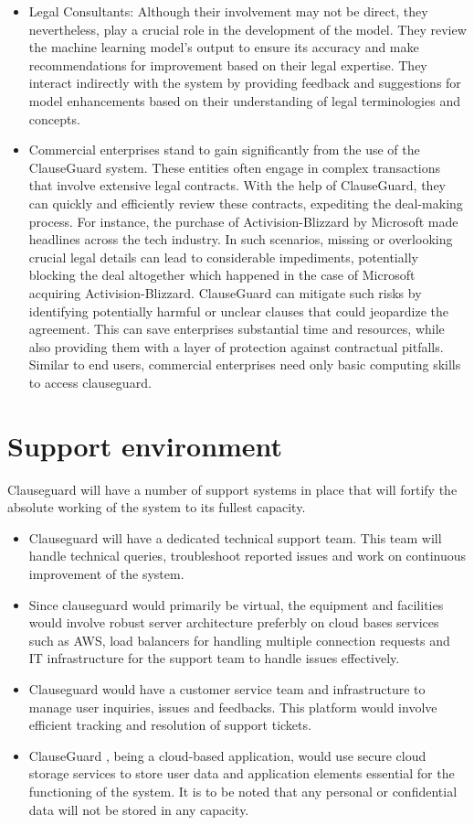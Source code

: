 \begin{itemize}
    \item Legal Consultants: Although their involvement may not be direct, they nevertheless, play a crucial role in the development of the model. They review the machine learning model's output to ensure its accuracy and make recommendations for improvement based on their legal expertise. They interact indirectly with the system by providing feedback and suggestions for model enhancements based on their understanding of legal terminologies and concepts.
    \item Commercial enterprises stand to gain significantly from the use of the ClauseGuard system. These entities often engage in complex transactions that involve extensive legal contracts. With the help of ClauseGuard, they can quickly and efficiently review these contracts, expediting the deal-making process. For instance,  the  purchase of Activision-Blizzard by Microsoft made headlines across the tech industry. In such scenarios, missing or overlooking crucial legal details can lead to considerable impediments, potentially blocking the deal altogether which happened in the case of Microsoft acquiring Activision-Blizzard. ClauseGuard can mitigate such risks by identifying potentially harmful or unclear clauses that could jeopardize the agreement. This can save enterprises substantial time and resources, while also providing them with a layer of protection against contractual pitfalls. Similar to end users, commercial enterprises need only basic computing skills to access clauseguard. 

\end{itemize}


\section{Support environment \label{Section::Support Environment}}
Clauseguard will have a number of support systems in place that will fortify the absolute working of the system to its fullest capacity. 
\begin{itemize}
    \item Clauseguard will have a dedicated technical support team. This team will handle technical queries, troubleshoot reported issues and work on continuous improvement of the system. 
    \item Since clauseguard would primarily be virtual, the equipment and facilities would involve robust server architecture preferbly on cloud bases services such as AWS, load balancers for handling multiple connection requests and IT infrastructure for the support team to handle issues effectively. 
    \item Clauseguard would have a customer service team and infrastructure to manage user inquiries, issues and feedbacks. This platform would involve efficient tracking and resolution of support tickets. 
    \item ClauseGuard , being a cloud-based application, would use secure cloud storage services to store user data and application elements essential for the functioning of the system. It is to be noted that any personal or confidential data will not be stored in any capacity. 
\end{itemize}




